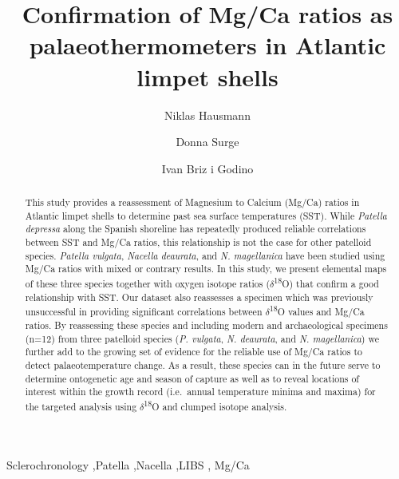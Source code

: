 \documentclass[
  authoryear,
  preprint,
  3p]{elsarticle}
\begin{document}
\begin{frontmatter}
\title{Confirmation of Mg/Ca ratios as palaeothermometers in Atlantic
limpet shells}
\author[1]{Niklas Hausmann%
%
}
\author[2]{Donna Surge%
%
}

\author[3]{Ivan Briz i Godino%
%
}






        
\begin{abstract}
This study provides a reassessment of Magnesium to Calcium (Mg/Ca)
ratios in Atlantic limpet shells to determine past sea surface
temperatures (SST). While \emph{Patella depressa} along the Spanish
shoreline has repeatedly produced reliable correlations between SST and
Mg/Ca ratios, this relationship is not the case for other patelloid
species. \emph{Patella vulgata}, \emph{Nacella deaurata}, and \emph{N.
magellanica} have been studied using Mg/Ca ratios with mixed or contrary
results. In this study, we present elemental maps of these three species
together with oxygen isotope ratios ($\delta$\textsuperscript{18}O)
that confirm a good relationship with SST. Our dataset also reassesses a
specimen which was previously unsuccessful in providing significant
correlations between $\delta$\textsuperscript{18}O values and Mg/Ca
ratios. By reassessing these species and including modern and
archaeological specimens (n=12) from three patelloid species (\emph{P.
vulgata}, \emph{N. deaurata}, and \emph{N. magellanica}) we further add
to the growing set of evidence for the reliable use of Mg/Ca ratios to
detect palaeotemperature change. As a result, these species can in the
future serve to determine ontogenetic age and season of capture as well
as to reveal locations of interest within the growth record (i.e.~annual
temperature minima and maxima) for the targeted analysis using
$\delta$\textsuperscript{18}O and clumped isotope analysis.
\end{abstract}





\begin{keyword}
    Sclerochronology \sep Patella \sep Nacella \sep LIBS \sep 
    Mg/Ca
\end{keyword}
\end{frontmatter}
    
\end{document}
